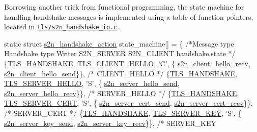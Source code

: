 Borrowing another trick from functional programming, the state machine for handling handshake messages is implemented using a table of function pointers, located in \href{https://github.com/awslabs/s2n/blob/master/tls/s2n_handshake_io.c}{\tt tls/s2n\+\_\+handshake\+\_\+io.\+c}.


\begin{DoxyCode}
\textcolor{keyword}{static} \textcolor{keyword}{struct }\hyperlink{structs2n__handshake__action}{s2n\_handshake\_action} state\_machine[] = \{
    \textcolor{comment}{/*Message type  Handshake type       Writer S2N\_SERVER                S2N\_CLIENT                  
       handshake.state              */}
    \{\hyperlink{s2n__fragmentation__coalescing__test_8c_a04fd920fd9f28238887e4c6417b4d4cc}{TLS\_HANDSHAKE}, \hyperlink{s2n__handshake__io_8c_a97bbcc3a3f636384bc16b898d90879ea}{TLS\_CLIENT\_HELLO},      \textcolor{charliteral}{'C'}, \{
      \hyperlink{s2n__client__hello_8c_abfb7d01ea645110aea3c808de4d86f1d}{s2n\_client\_hello\_recv},    \hyperlink{s2n__client__hello_8c_a4b86117a2a4f018991a01ff788272441}{s2n\_client\_hello\_send}\}\},    \textcolor{comment}{/*
       CLIENT\_HELLO              */}
    \{\hyperlink{s2n__fragmentation__coalescing__test_8c_a04fd920fd9f28238887e4c6417b4d4cc}{TLS\_HANDSHAKE}, \hyperlink{s2n__handshake__io_8c_a048b49dbe4e0abcdaa5f50b2ecd91fc4}{TLS\_SERVER\_HELLO},      \textcolor{charliteral}{'S'}, \{
      \hyperlink{s2n__server__hello_8c_a8e32b708f98ecbfa1148c5393f8b9dba}{s2n\_server\_hello\_send},    \hyperlink{s2n__server__hello_8c_a2139f810755eb8cf27ebea179e81ac81}{s2n\_server\_hello\_recv}\}\},    \textcolor{comment}{/*
       SERVER\_HELLO              */}
    \{\hyperlink{s2n__fragmentation__coalescing__test_8c_a04fd920fd9f28238887e4c6417b4d4cc}{TLS\_HANDSHAKE}, \hyperlink{s2n__handshake__io_8c_a38cffd9bc0cc95a332e46519976d472f}{TLS\_SERVER\_CERT},       \textcolor{charliteral}{'S'}, \{
      \hyperlink{s2n__server__cert_8c_ab1bb9b2e08cb682e4bb9b156b49a0afa}{s2n\_server\_cert\_send},     \hyperlink{s2n__server__cert_8c_aea75ffb292cac5d71183fee7c14b7496}{s2n\_server\_cert\_recv}\}\},     \textcolor{comment}{/*
       SERVER\_CERT               */}
    \{\hyperlink{s2n__fragmentation__coalescing__test_8c_a04fd920fd9f28238887e4c6417b4d4cc}{TLS\_HANDSHAKE}, \hyperlink{s2n__handshake__io_8c_a9d3fa686a8b630798a5b93e4267937f2}{TLS\_SERVER\_KEY},        \textcolor{charliteral}{'S'}, \{
      \hyperlink{s2n__server__key__exchange_8c_a940aed548236e016710e5ef69dc98df8}{s2n\_server\_key\_send},      \hyperlink{s2n__server__key__exchange_8c_a933dc8cdaebb70f8a7364e390d9deeaf}{s2n\_server\_key\_recv}\}\},      \textcolor{comment}{/* SERVER\_KEY  
}
\end{DoxyCode}
